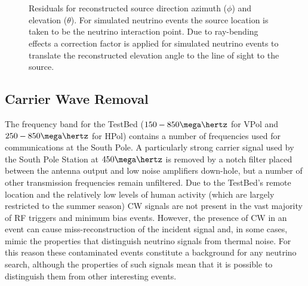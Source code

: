 \begin{figure}[htpb]
  \hfill
  \\
  \hfill
  \\
  \hfill
  \caption{Residuals for reconstructed source direction azimuth ($\phi$) and elevation ($\theta$). For simulated neutrino events the source location is taken to be the neutrino interaction point. Due to ray-bending effects a correction factor is applied for simulated neutrino events to translate the reconstructed elevation angle to the line of sight to the source.}
  \label{fig:analysis:Reconstructed:CSW-Residuals}
\end{figure}

\subsection{Carrier Wave Removal}
\label{sec:Analysis:CWRemoval}

The frequency band for the TestBed ($150 - 850 \mega \hertz$ for VPol and $250 - 850 \mega \hertz$ for HPol) contains a number of frequencies used for communications at the South Pole. A particularly strong carrier signal used by the South Pole Station at $450 \mega \hertz$ is removed by a notch filter placed between the antenna output and low noise amplifiers down-hole, but a number of other transmission frequencies remain unfiltered. Due to the TestBed's remote location and the relatively low levels of human activity (which are largely restricted to the summer season) CW signals are not present in the vast majority of RF triggers and minimum bias events. However, the presence of CW in an event can cause miss-reconstruction of the incident signal and, in some cases, mimic the properties that distinguish neutrino signals from thermal noise. For this reason these contaminated events constitute a background for any neutrino search, although the properties of such signals mean that it is possible to distinguish them from other interesting events. 

